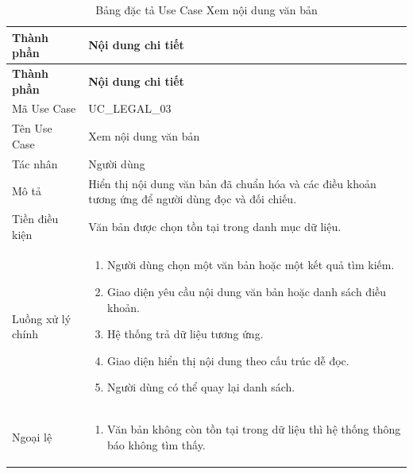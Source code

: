 \documentclass[12pt,a4paper,oneside]{report}
\begin{document}
{
  \begin{longtable}{|L{3.6cm}|L{11.2cm}|}
    \caption{Bảng đặc tả Use Case Xem nội dung văn bản}\label{tab:uc-legal-view}                                           \\
    \hline
    \textbf{Thành phần} & \textbf{Nội dung chi tiết}                                                                         \\
    \hline
    \endfirsthead
    \hline
    \textbf{Thành phần} & \textbf{Nội dung chi tiết}                                                                         \\
    \hline
    \endhead
    Mã Use Case       & UC\_LEGAL\_03                                                                                      \\
    \hline
    Tên Use Case      & Xem nội dung văn bản                                                                               \\
    \hline
    Tác nhân            & Người dùng                                                                                         \\
    \hline
    Mô tả               & Hiển thị nội dung văn bản đã chuẩn hóa và các điều khoản tương ứng để người dùng đọc và đối chiếu. \\
    \hline
    Tiền điều kiện      & Văn bản được chọn tồn tại trong danh mục dữ liệu.                                                  \\
    \hline
    Luồng xử lý chính   & \begin{enumerate}[leftmargin=*,nosep]
                            \item Người dùng chọn một văn bản hoặc một kết quả tìm kiếm.
                            \item Giao diện yêu cầu nội dung văn bản hoặc danh sách điều khoản.
                            \item Hệ thống trả dữ liệu tương ứng.
                            \item Giao diện hiển thị nội dung theo cấu trúc dễ đọc.
                            \item Người dùng có thể quay lại danh sách.
                          \end{enumerate}                                 \\
    \hline
    Ngoại lệ            & \begin{enumerate}[leftmargin=*,nosep]
                            \item Văn bản không còn tồn tại trong dữ liệu thì hệ thống thông báo không tìm thấy.

\end{enumerate}
\end{longtable}}
\end{document}
